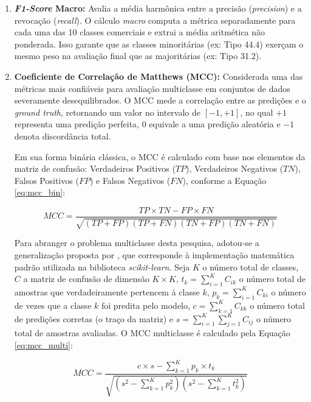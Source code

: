     \begin{enumerate}
        \item \textbf{\textit{F1-Score} Macro:} Avalia a média harmônica entre a precisão (\textit{precision}) e a revocação (\textit{recall}). O cálculo \textit{macro} computa a métrica separadamente para cada uma das 10 classes comerciais e extrai a média aritmética não ponderada. Isso garante que as classes minoritárias (ex: Tipo 44.4) exerçam o mesmo peso na avaliação final que as majoritárias (ex: Tipo 31.2).
        
        \item \textbf{Coeficiente de Correlação de Matthews (MCC):} Considerada uma das métricas mais confiáveis para avaliação multiclasse em conjuntos de dados severamente desequilibrados. O MCC mede a correlação entre as predições e o \textit{ground truth}, retornando um valor no intervalo de $[-1, +1]$, no qual $+1$ representa uma predição perfeita, $0$ equivale a uma predição aleatória e $-1$ denota discordância total.
        
        Em sua forma binária clássica, o MCC é calculado com base nos elementos da matriz de confusão: Verdadeiros Positivos ($TP$), Verdadeiros Negativos ($TN$), Falsos Positivos ($FP$) e Falsos Negativos ($FN$), conforme a Equação \ref{eq:mcc_bin}:
        
        \begin{equation}
            MCC = \frac{TP \times TN - FP \times FN}{\sqrt{(TP+FP)(TP+FN)(TN+FP)(TN+FN)}}
            \label{eq:mcc_bin}
        \end{equation}

        Para abranger o problema multiclasse desta pesquisa, adotou-se a generalização proposta por , que corresponde à implementação matemática padrão utilizada na biblioteca \textit{scikit-learn}. Seja $K$ o número total de classes, $C$ a matriz de confusão de dimensão $K \times K$, $t_k = \sum_{i=1}^{K} C_{ik}$ o número total de amostras que verdadeiramente pertencem à classe $k$, $p_k = \sum_{i=1}^{K} C_{ki}$ o número de vezes que a classe $k$ foi predita pelo modelo, $c = \sum_{k=1}^{K} C_{kk}$ o número total de predições corretas (o traço da matriz) e $s = \sum_{i=1}^{K} \sum_{j=1}^{K} C_{ij}$ o número total de amostras avaliadas. O MCC multiclasse é calculado pela Equação \ref{eq:mcc_multi}:

        \begin{equation}
            MCC = \frac{c \times s - \sum_{k=1}^{K} p_k \times t_k}{\sqrt{\left(s^2 - \sum_{k=1}^{K} p_k^2\right)\left(s^2 - \sum_{k=1}^{K} t_k^2\right)}}
            \label{eq:mcc_multi}
        \end{equation}
        

\end{enumerate}
